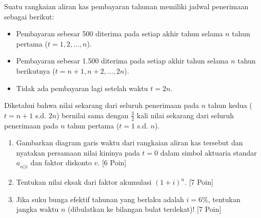 \documentclass[11pt,a4paper]{article}
\newcommand{\angl}[1]{\overline{#1|}}
\begin{document}
\begin{naskahsoalbox}
Suatu rangkaian aliran kas pembayaran tahunan memiliki jadwal penerimaan sebagai berikut:
\begin{itemize}[leftmargin=4mm, topsep=1pt, itemsep=1pt]
    \item Pembayaran sebesar 500 diterima pada setiap akhir tahun selama $n$ tahun pertama ($t = 1, 2, \dots, n$).
    \item Pembayaran sebesar 1.500 diterima pada setiap akhir tahun selama $n$ tahun berikutnya ($t = n+1, n+2, \dots, 2n$).
    \item Tidak ada pembayaran lagi setelah waktu $t = 2n$.
\end{itemize}
Diketahui bahwa nilai sekarang dari seluruh penerimaan pada $n$ tahun kedua ($t = n+1$ s.d. $2n$) bernilai sama dengan $\frac{3}{2}$ kali nilai sekarang dari seluruh penerimaan pada $n$ tahun pertama ($t = 1$ s.d. $n$).
\begin{enumerate}[label=(\alph*), topsep=2pt, itemsep=2pt]
    \item Gambarkan diagram garis waktu dari rangkaian aliran kas tersebut dan nyatakan persamaan nilai kininya pada $t=0$ dalam simbol aktuaria standar $a_{\angl{n}|i}$ dan faktor diskonto $v$. \hfill [6 Poin]
    \item Tentukan nilai eksak dari faktor akumulasi $(1+i)^n$. \hfill [7 Poin]
    \item Jika suku bunga efektif tahunan yang berlaku adalah $i = 6\%$, tentukan jangka waktu $n$ (dibulatkan ke bilangan bulat terdekat)! \hfill [7 Poin]
\end{enumerate}
\end{naskahsoalbox}
\end{document}
